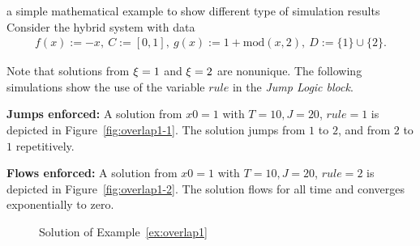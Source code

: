 
\begin{example}{a simple mathematical example to show different type of simulation results}
\label{ex:overlap1}
Consider the hybrid system with data
\begin{eqnarray*}
f(x) := -x,\ C:= [0,1], \
g(x) := 1+\mbox{mod}(x,2), \ D:=  \{1\}\cup\{2\}.
\end{eqnarray*}

Note that solutions from $\xi = 1$ and $\xi = 2$ are
nonunique.  The following simulations show the use of the variable
$rule$ in the {\em Jump Logic block}.

{\bf Jumps enforced:}
A solution from $x0=1$ with $T=10,J=20$, $rule = 1$ is depicted in
Figure~\ref{fig:overlap1-1}. The solution jumps from $1$ to
$2$, and from $2$ to $1$ repetitively.

{\bf Flows enforced:}
A solution from $x0=1$ with $T=10,J=20$, $rule = 2$ is depicted in
Figure~\ref{fig:overlap1-2}. The solution flows for all time
and converges exponentially to zero.

\begin{figure}[ht]
\begin{center}
\qquad
{}
\end{center}
\caption{Solution of Example~\ref{ex:overlap1}}
\end{figure}


\end{example}
